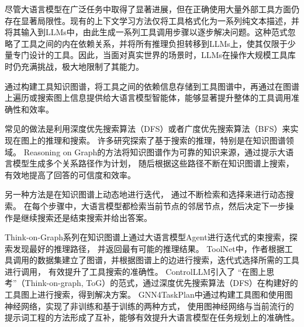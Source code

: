 


尽管大语言模型在广泛任务中取得了显著进展，但在正确使用大量外部工具方面仍存在显著局限性。现有的上下文学习方法仅将工具格式化为一系列纯文本描述，并将其输入到LLMs中，由此生成一系列工具调用步骤以逐步解决问题。这种范式忽略了工具之间的内在依赖关系，并将所有推理负担转移到LLMs上，使其仅限于少量专门设计的工具。因此，当面对真实世界的场景时，LLMs在操作大规模工具库时仍充满挑战，极大地限制了其能力。

通过构建工具知识图谱，将工具之间的依赖信息存储到工具图谱中，再通过在图谱上遍历或搜索图上信息提供给大语言模型智能体，能够显著提升整体的工具调用准确性和效率。

常见的做法是利用深度优先搜索算法（DFS）或者广度优先搜索算法（BFS）来实现在图上的推理和搜索。
许多研究探索了基于搜索的推理，特别是在知识图谱领域。
Reasoning on Graph\cite{Luo2023}的方法将知识图谱作为可靠的知识来源，通过提示大语言模型生成多个关系路径作为计划，
随后根据这些路径不断在知识图谱上搜索，有效地提高了回答的可信度和效率。

另一种方法是在知识图谱上动态地进行迭代，
通过不断检索和选择来进行动态搜索\cite{Liu2024, Sun2023, Ma2024}。
在每个步骤中，大语言模型都检索当前节点的邻居节点，然后决定下一步操作是继续搜索还是结束搜索并给出答案。


Think-on-Graph系列\cite{Sun2023,Ma2024}在知识图谱上通过大语言模型Agent进行迭代式的束搜索，探索发现最好的推理路径，
并返回最有可能的推理结果。
ToolNet\cite{Liu2024}中，作者根据工具调用的数据集建立了图谱，并根据图谱上的边进行搜索，迭代式选择所需的工具进行调用，
有效提升了工具搜索的准确性。
ControlLLM\cite{Liu2023a}引入了 “在图上思考”（Think-on-graph, ToG）的范式，通过深度优先搜索算法（DFS）在构建好的工具图上进行搜索，得到解决方案。
GNN4TaskPlan中\cite{wucan2024}通过构建工具图和使用图神经网络，实现了非训练和基于训练的两种方式，
使用图神经网络与当前流行的提示词工程的方法形成了互补，能够有效提升大语言模型在任务规划上的准确性。

